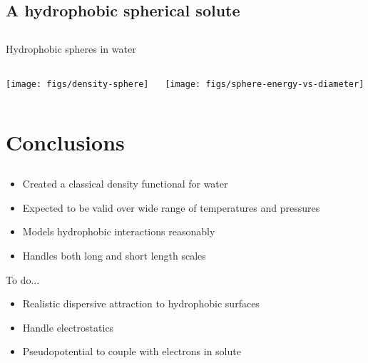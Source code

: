 \documentclass[compress]{beamer}
\begin{document}
\subsection{A hydrophobic spherical solute}
\subsection*{}

\begin{frame}[fragile]{Hydrophobic spheres in water}
  \begin{columns}
    \begin{column}{0.5\columnwidth}
      \texttt{[image: figs/density-sphere]}
    \end{column}
    \begin{column}{0.5\columnwidth}
      \texttt{[image: figs/sphere-energy-vs-diameter]}
    \end{column}
  \end{columns}
\end{frame}


\section{Conclusions}
\subsection*{}

\begin{frame}[fragile]{}
  \begin{block}{}
    \begin{itemize}
    \item Created a classical density functional for water
    \item Expected to be valid over wide range of temperatures and pressures
    \item Models hydrophobic interactions reasonably
    \item Handles both long and short length scales
    \end{itemize}
  \end{block}
  \begin{block}{To do...}
    \begin{itemize}
    \item Realistic dispersive attraction to hydrophobic surfaces
    \item Handle electrostatics
    \item Pseudopotential to couple with electrons in solute
    \end{itemize}
  \end{block}
\end{frame}
\end{document}
